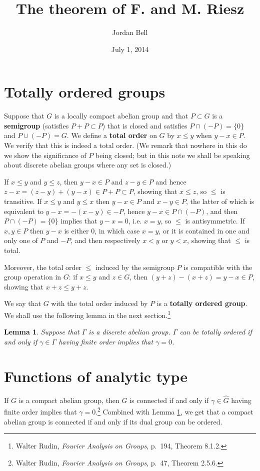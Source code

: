 \documentclass{article}
\newtheorem{lemma}[theorem]{Lemma}
\begin{document}
\title{The theorem of F. and M. Riesz}
\author{Jordan Bell}
\date{July 1, 2014}
\maketitle


\section{Totally ordered groups}
Suppose that $G$ is a locally compact abelian group and that  $P \subset G$ is a \textbf{semigroup} (satisfies $P+P \subset P$) that is closed
and satisfies $P \cap (-P) = \{0\}$ and $P \cup (-P) = G$.
We define a \textbf{total order} on $G$ by $x \leq y$ when $y - x \in P$. We verify that this is indeed a total order. (We remark
that nowhere in this do we show the significance of $P$ being closed; but in this note we shall be speaking about discrete abelian groups
where any set is closed.)

If $x \leq y$ and $y \leq z$, then $y-x \in P$ and $z-y \in P$ and hence $z-x=(z-y)+(y-x) \in P+P \subset P$, showing that
$x \leq z$, so $\leq$ is transitive. If $x \leq y$ and $y \leq x$ then $y-x \in P$ and $x-y \in P$, the latter of which
is equivalent to $y-x=-(x-y) \in -P$, hence $y-x \in P \cap (-P)$, and  then $P \cap (-P) = \{0\}$ implies that $y-x=0$, i.e. $x=y$, so
$\leq$ is antisymmetric. If $x,y \in P$ then $y-x$ is either $0$, in which case $x=y$, or it is contained in one and only
one of $P$ and $-P$, and then respectively $x<y$ or $y<x$, showing that $\leq$ is total. 

Moreover, the total order $\leq$ induced by the semigroup $P$ is compatible with the group operation in $G$:
if $x \leq y$ and $z \in G$, then $(y+z)-(x+z)=y-x \in P$, showing that $x+z \leq y+z$. 

We say that $G$ with the total order induced by $P$ is a \textbf{totally ordered group}. We shall use the following lemma in the next section.\footnote{Walter Rudin, {\em Fourier Analysis on Groups}, p.~194, Theorem 8.1.2.}

\begin{lemma}
Suppose that $\Gamma$ is a discrete abelian group.  $\Gamma$ can be totally ordered if and only if $\gamma \in \Gamma$
having finite order implies that $\gamma=0$.
\label{812}
\end{lemma}



\section{Functions of analytic type}
If $G$ is a compact abelian group, then $G$ is connected if and only if $\gamma \in \widehat{G}$ having finite order implies that
$\gamma=0$.\footnote{Walter Rudin, {\em Fourier Analysis on Groups}, p.~47, Theorem 2.5.6.} Combined with Lemma \ref{812},
we get that a compact abelian group is connected if and only if its dual group can be ordered.
\end{document}
